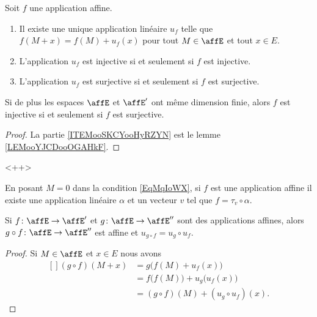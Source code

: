 \begin{proposition}     \label{PROPooALXYooHoMdqQ}
    Soit \( f\) une application affine.
    \begin{enumerate}
        \item       \label{ITEMooSKCYooHyRZYN}
            Il existe une unique application linéaire \( u_f\) telle que \( f(M+x)=f(M)+u_f(x)\) pour tout \( M\in \affE\) et tout \( x\in E\).
        \item
            L'application \( u_f\) est injective si et seulement si \( f\) est injective.
        \item
            L'application \( u_f\) est surjective si et seulement si \( f\) est surjective.
    \end{enumerate}
    Si de plus les espaces \( \affE\) et \( \affE'\) ont même dimension finie, alors \( f\) est injective si et seulement si \( f\) est surjective.
\end{proposition}

\begin{proof}
    La partie \ref{ITEMooSKCYooHyRZYN} est le lemme \ref{LEMooYJCDooOGAHkF}.
\end{proof}
<++>

\begin{normaltext}  \label{NORMooMWEEooOTUQNB}
En posant \( M=0\) dans la condition \eqref{EqMqIoWX}, si \( f\) est une application affine il existe une application linéaire \( \alpha\) et un vecteur \( v\) tel que \( f=\tau_v\circ \alpha\).
\end{normaltext}



\begin{proposition}
    Si \( f\colon \affE\to \affE'\) et \( g\colon \affE\to \affE''\) sont des applications affines, alors \( g\circ f\colon \affE\to \affE''\) est affine et \( u_{g\circ f}=u_g\circ u_f\).
\end{proposition}

\begin{proof}
    Si \( M\in\affE\) et \( x\in E\) nous avons
    \begin{equation}
        \begin{aligned}[]
            (g\circ f)(M+x)&=g\big( f(M)+u_f(x) \big)\\
            &=f\big( f(M) \big)+u_g\big( u_f(x) \big)\\
            &=(g\circ f)(M)+(u_g\circ u_f)(x).
        \end{aligned}
    \end{equation}
\end{proof}

